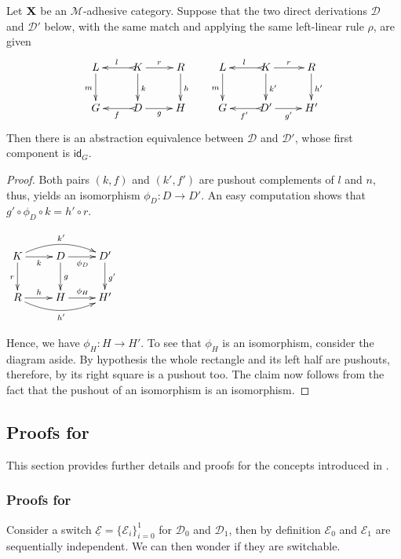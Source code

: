 \documentclass[a4paper,UKenglish,cleveref,pdftex,thm-restate,numberwithinsect]{lipics-v2021}
\newcommand{\id}[1]{\mathsf{id}_{#1}}
\def\X{\textbf {\textup{X}}}
\def\G{\textbf {\textup{G}}}
\newcommand{\dder}[1]{\mathscr{#1}}
\newcommand{\der}[1]{\underline{\dder{#1}}}
\begin{document}
\begin{proposition}
  \label{prop:unique}
  Let $\X$ be an $\mathcal{M}$-adhesive category. Suppose that the two
  direct derivations $\dder{D}$ and $\dder{D}'$ below, with the same
  match and applying the same left-linear rule $\rho$, are given
  \[\xymatrix{L \ar[d]_{m}& K \ar[d]^{k}\ar@{>->}[l]_{l} \ar[r]^{r} &
      R \ar[d]^{h} & L \ar[d]_{m}& K \ar[d]^{k'}\ar@{>->}[l]_{l}
      \ar[r]^{r} & R \ar[d]^{h'}\\G & \ar@{>->}[l]^{f} D \ar[r]_{g}& H
      & G & \ar@{>->}[l]^{f'} D' \ar[r]_{g'}& H'}\]
  Then there is an abstraction equivalence between $\dder{D}$ and
  $\dder{D}'$, whose first component is $\id{G}$.
\end{proposition}
\begin{proof}
  Both pairs $(k, f)$ and $(k', f')$ are pushout complements of $l$
  and $n$, thus,  yields an isomorphism
  $\phi_D\colon D\to D'$. An easy computation shows that $g'\circ \phi_D \circ k=h'\circ r$.
  \noindent
  \parbox{3cm}{
    $\xymatrix{K \ar@/^.4cm/[rr]^{k'}\ar[d]_{r} \ar[r]_{k}&
      \ar[r]_{\phi_D} D \ar[d]^{g}& D' \ar[d]^{g'}\\ R
      \ar@/_.4cm/[rr]_{h'} \ar[r]^{h}& H \ar[r]^{\phi_H}& H'}$}
  \hfill
  \parbox{10cm}{ \hspace{15pt}Hence, we have
    $\phi_H\colon H\to H'$. To see that $\phi_H$ is an isomorphism,
    consider the diagram aside. By hypothesis the whole rectangle and
    its left half are pushouts, therefore, by  its right
    square is a pushout too. The claim now follows from the fact that
    the pushout of an isomorphism is an isomorphism. \qedhere }
\end{proof}


\subsection{Proofs for }

This section provides further details and proofs for the concepts introduced in .

\subsubsection{Proofs for }
Consider a switch $\der{E}=\{\dder{E}_i\}_{i=0}^1$ for $\dder{D}_0$
and $\dder{D}_1$, then by definition $\dder{E}_0$ and $\dder{E}_1$ are
sequentially independent. We can then wonder if they are switchable.
\end{document}
